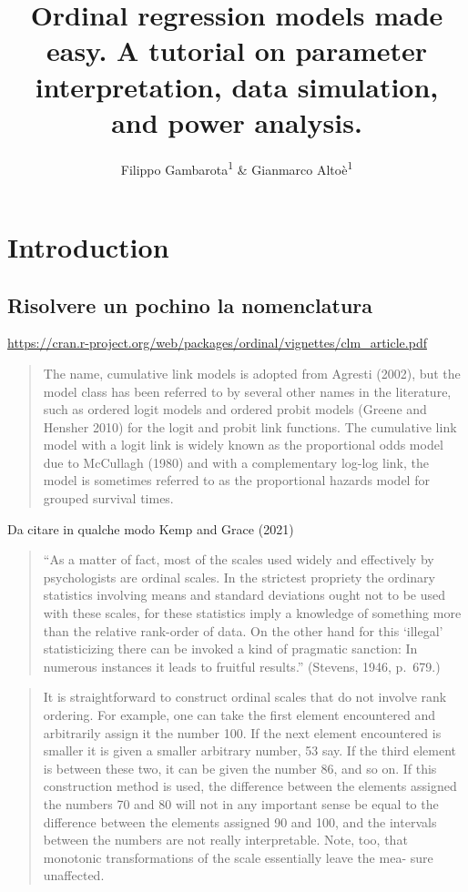 \documentclass[
  man,floatsintext]{apa6}
\title{Ordinal regression models made easy. A tutorial on parameter interpretation, data simulation, and power analysis.}
\author{Filippo Gambarota\textsuperscript{1} \& Gianmarco Altoè\textsuperscript{1}}
\date{}
\affiliation{\vspace{0.5cm}\textsuperscript{1} Department of Developmental Psychology and Socialization, University of Padova, Italy}
\begin{document}
\maketitle

\section{Introduction}\label{introduction}

\subsection{Risolvere un pochino la nomenclatura}\label{risolvere-un-pochino-la-nomenclatura}

\url{https://cran.r-project.org/web/packages/ordinal/vignettes/clm_article.pdf}

\begin{quote}
The name, cumulative link models is adopted from Agresti (2002), but the model class has
been referred to by several other names in the literature, such as ordered logit models and
ordered probit models (Greene and Hensher 2010) for the logit and probit link functions. The
cumulative link model with a logit link is widely known as the proportional odds model due
to McCullagh (1980) and with a complementary log-log link, the model is sometimes referred
to as the proportional hazards model for grouped survival times.
\end{quote}

Da citare in qualche modo Kemp and Grace (2021)

\begin{quote}
``As a matter of fact, most of the scales used widely and effectively by psychologists are ordinal scales. In the strictest propriety the ordinary statistics involving means and standard deviations ought not to be used with these scales, for these statistics imply a knowledge of something more than the relative rank-order of data. On the other hand for this `illegal' statisticizing there can be invoked a kind of pragmatic sanction: In numerous instances it leads to fruitful results.'' (Stevens, 1946, p.~679.)
\end{quote}

\begin{quote}
It is straightforward to construct ordinal scales that do not involve rank ordering. For example, one can take the first element encountered and arbitrarily assign it the number 100. If the next element encountered is smaller it is given a smaller arbitrary number, 53 say. If the third element is between these two, it can be given the number 86, and so on. If this construction method is used, the difference between the elements assigned the numbers 70 and 80 will not in any important sense be equal to the difference between the elements assigned 90 and 100, and the intervals between the numbers are not really interpretable. Note, too, that monotonic transformations of the scale essentially leave the mea- sure unaffected.
\end{quote}
\end{document}
